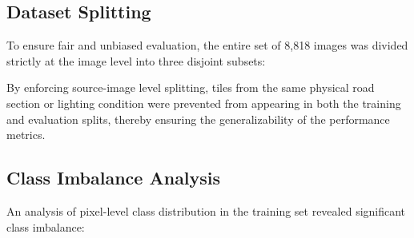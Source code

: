 \subsection{Dataset Splitting}

\hs To ensure fair and unbiased evaluation, the entire set of 8,818 images was divided strictly at the image level into three disjoint subsets:

\begin{table}[htbp]
    \centering
    \caption{Summary of public crack dataset partition.}
    \label{tab:dataset_split}
    \renewcommand{\arraystretch}{1.1}
\end{table}

\hs By enforcing source-image level splitting, tiles from the same physical road section or lighting condition were prevented from appearing in both the training and evaluation splits, thereby ensuring the generalizability of the performance metrics.

\subsection{Class Imbalance Analysis}
\hs An analysis of pixel-level class distribution in the training set revealed significant class imbalance:


